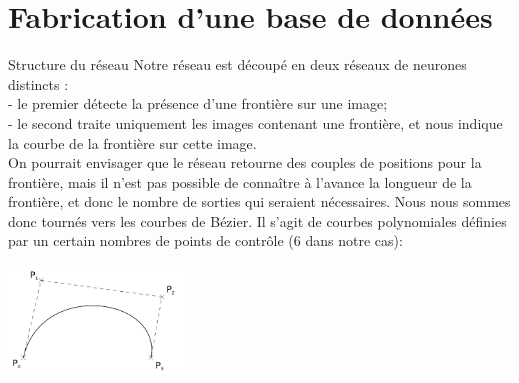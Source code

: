 \documentclass[ignorenonframetext,]{beamer}
\begin{document}


\section{Fabrication d'une base de données}
\frame{\sectionpage}

\begin{frame}{Structure du réseau}
	Notre réseau est découpé en deux réseaux de neurones distincts :\\
	\quad - le premier détecte la présence d'une frontière sur une image;\\
	\quad - le second traite uniquement les images contenant une frontière, et nous indique la courbe de la frontière sur cette image.\\
	\vspace*{5px}
	On pourrait envisager que le réseau retourne des couples de positions pour la frontière, mais il n'est pas possible de connaître à l'avance la longueur de la frontière, et donc le nombre de sorties qui seraient nécessaires. Nous nous sommes donc tournés vers les courbes de Bézier. Il s'agit de courbes polynomiales définies par un certain nombres de points de contrôle (6 dans notre cas):\\
	\vspace*{-5px}
	\begin{center}
		\includegraphics[width=0.35\textwidth]{bezier.png}
	\end{center}
\end{frame}
\end{document}
